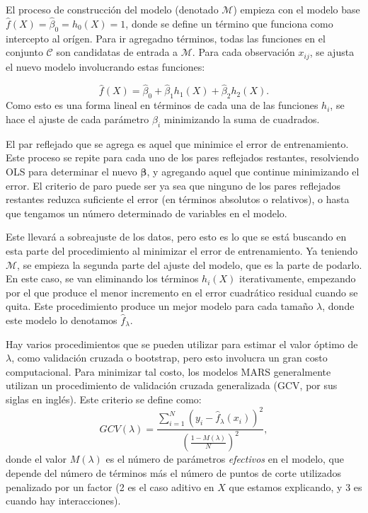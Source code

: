 \documentclass[
]{article}
\begin{document}
El proceso de construcción del modelo (denotado \(\mathcal{M}\)) empieza
con el modelo base \(\hat f(X) = \hat \beta_0 = h_0(X) = 1\), donde se
define un término que funciona como intercepto al orígen. Para ir
agregadno términos, todas las funciones en el conjunto \(\mathcal{C}\)
son candidatas de entrada a \(\mathcal{M}\). Para cada observación
\(x_{ij}\), se ajusta el nuevo modelo involucrando estas funciones:

\[
\hat f(X) = \hat \beta_0 + \hat \beta_1 h_1(X) + \hat \beta_2 h_2(X).
\] Como esto es una forma lineal en términos de cada una de las
funciones \(h_i\), se hace el ajuste de cada parámetro \(\hat \beta_i\)
minimizando la suma de cuadrados.

El par reflejado que se agrega es aquel que minimice el error de
entrenamiento. Este proceso se repite para cada uno de los pares
reflejados restantes, resolviendo OLS para determinar el nuevo
\(\boldsymbol\beta\), y agregando aquel que continue minimizando el
error. El criterio de paro puede ser ya sea que ninguno de los pares
reflejados restantes reduzca suficiente el error (en términos absolutos
o relativos), o hasta que tengamos un número determinado de variables en
el modelo.

Este llevará a sobreajuste de los datos, pero esto es lo que se está
buscando en esta parte del procedimiento al minimizar el error de
entrenamiento. Ya teniendo \(\mathcal{M}\), se empieza la segunda parte
del ajuste del modelo, que es la parte de podarlo. En este caso, se van
eliminando los términos \(h_i(X)\) iterativamente, empezando por el que
produce el menor incremento en el error cuadrático residual cuando se
quita. Este procedimiento produce un mejor modelo para cada tamaño
\(\lambda\), donde este modelo lo denotamos \(\hat f_\lambda\).

Hay varios procedimientos que se pueden utilizar para estimar el valor
óptimo de \(\lambda\), como validación cruzada o bootstrap, pero esto
involucra un gran costo computacional. Para minimizar tal costo, los
modelos MARS generalmente utilizan un procedimiento de validación
cruzada generalizada (GCV, por sus siglas en inglés). Este criterio se
define como: \[
GCV(\lambda) = \frac{ \sum_{i=1}^N (y_i - \hat f_\lambda(x_i))^2 }{\left( \frac{1 - M(\lambda)}{N} \right)^2},
\] donde el valor \(M(\lambda)\) es el número de parámetros
\emph{efectivos} en el modelo, que depende del número de términos más el
número de puntos de corte utilizados penalizado por un factor (2 es el
caso aditivo en \(X\) que estamos explicando, y 3 es cuando hay
interacciones).
\end{document}
